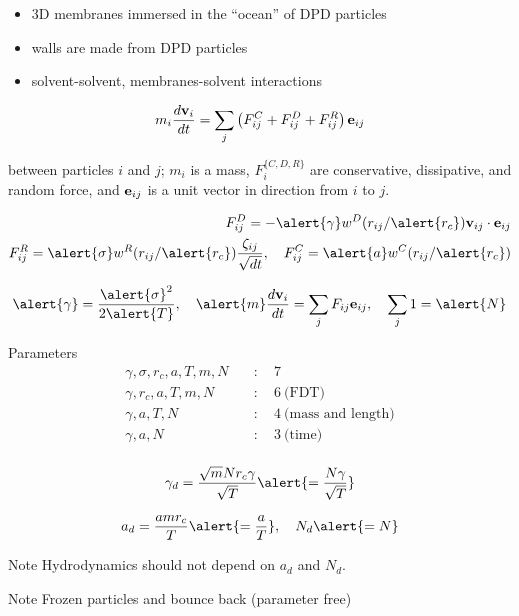 \begin{itemize}
  \item 3D membranes immersed in the ``ocean'' of DPD particles
  \item walls are made from DPD particles
  \item solvent-solvent, membranes-solvent interactions
\end{itemize}

\[
  m_i \frac{d \mathbf{v}_i}{dt} = \sum_{j}
  \left(
    F_{ij}^{C} + F_{ij}^{D} + F_{ij}^{R}
  \right) \mathbf{e}_{ij}{}
\]

between particles $i$ and $j$; $m_i$ is a mass, $F_{i}^{\{C,D,R\}}$
are conservative, dissipative, and random force, and $\mathbf{e}_{ij}{}$ is a unit
vector in direction from $i$ to $j$.
\eframe

\begin{align*}
  \label{eq:FD}
  F_{ij}^D = - \alert{\gamma} w^{D}(r_{ij}/\alert{r_{c}}) \mathbf{v}_{ij} \cdot \mathbf{e}_{ij} \\
  F_{ij}^R = \alert{\sigma} w^{R}(r_{ij}/\alert{r_{c}}) \frac{\zeta_{ij}}{\sqrt{dt}}, \quad
  F_{ij}^C = \alert{a} w^C(r_{ij}/\alert{r_{c}})
\end{align*}

\[
  \alert{\gamma} =\frac{\alert{\sigma}^2}{2\alert{T}},
  \quad \alert{m} \frac{d \mathbf{v}_{i}}{dt} = \sum_j F_{ij} \mathbf{e}_{ij},
  \quad
  \sum_j 1 = \alert{N}
\]

\begin{exampleblock}{Parameters}
\begin{align*}
    \gamma,           \sigma ,     r_c, a, T,    m,    N \quad &: \quad 7 \\
    \gamma,                        r_c, a ,T,    m,    N \quad &: \quad 6\ \text{(FDT)} \\
    \gamma,                             a, T,    N       \quad &: \quad 4\ \text{(mass and length)} \\
    \gamma,                             a,       N       \quad &: \quad 3\ \text{(time)} \\
\end{align*}
\end{exampleblock}
\eframe

\[
  \gamma_d = \frac{ \sqrt{m} N r_c \gamma}{ \sqrt{T} }
  \alert{ = \frac{ N \gamma}{ \sqrt{T} } }
\]

\[
   a_d     = \frac{a m r_c}{ T } \alert{ = \frac{a}{T} }, \quad
   N_d                          \alert{ = N}
\]

\begin{exampleblock}{Note}
Hydrodynamics should not depend on  $a_d$ and $N_d$.
\end{exampleblock}
\eframe

\bcc
 \bc  
  \begin{exampleblock}{Note}
    Frozen particles and bounce back (parameter free)
  \end{exampleblock}
 \ec

 \bc
 \ec
\ecc
\eframe
